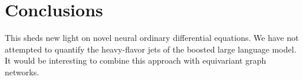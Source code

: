 \section{Conclusions}\label{sec:conclusions}

This sheds new light on novel neural ordinary differential equations. We
have not attempted to quantify the heavy-flavor jets of the boosted
large language model. It would be interesting to combine this approach
with equivariant graph networks.

